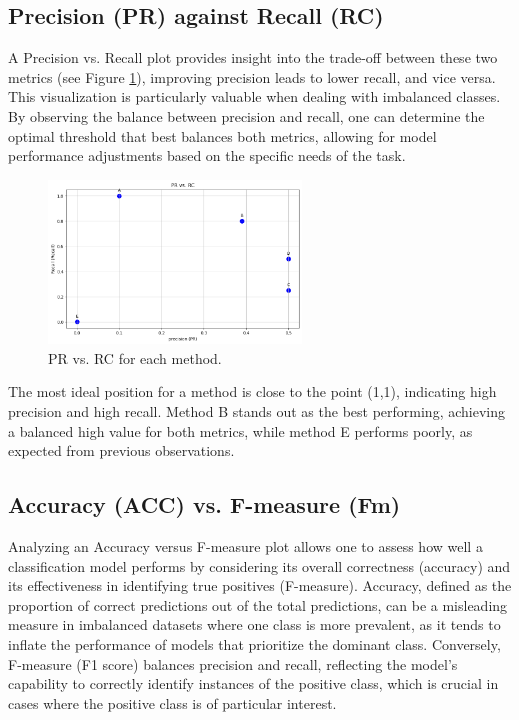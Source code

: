 \documentclass{llncs}
\begin{document}
\subsection{Precision (PR) against Recall (RC)}

A Precision vs. Recall plot provides insight into the trade-off between these two metrics (see Figure \ref{fig:PRyRC}), improving precision leads to lower recall, and vice versa. This visualization is particularly valuable when dealing with imbalanced classes. By observing the balance between precision and recall, one can determine the optimal threshold that best balances both metrics, allowing for model performance adjustments based on the specific needs of the task.


\begin{figure}[h!]
	\begin{center}
		\includegraphics[width=0.6\textwidth]{images/PR_RC.png}
		\caption{PR vs. RC for each method.}
		\label{fig:PRyRC}
	\end{center}
\end{figure}

The most ideal position for a method is close to the point (1,1), indicating high precision and high recall. Method B stands out as the best performing, achieving a balanced high value for both metrics, while method E performs poorly, as expected from previous observations.


\subsection{Accuracy (ACC) vs. F-measure (Fm)}

Analyzing an Accuracy versus F-measure plot allows one to assess how well a classification model performs by considering its overall correctness (accuracy) and its effectiveness in identifying true positives (F-measure). Accuracy, defined as the proportion of correct predictions out of the total predictions, can be a misleading measure in imbalanced datasets where one class is more prevalent, as it tends to inflate the performance of models that prioritize the dominant class. Conversely, F-measure (F1 score) balances precision and recall, reflecting the model’s capability to correctly identify instances of the positive class, which is crucial in cases where the positive class is of particular interest.
\end{document}
